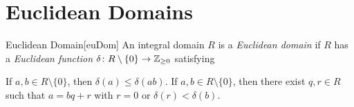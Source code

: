 \documentclass[../modern_algebra_2.tex]{subfiles}
\begin{document}
\section{Euclidean Domains}

\begin{Definition}{Euclidean Domain}[euDom]
    An integral domain \(R\) is a \emph{Euclidean domain} if \(R\) has a \emph{Euclidean function}
    \(\delta \colon R \setminus \{0\} \to \ZZ_{\ge 0}\) satisfying
    \begin{enumerate}[nolistsep, label=(EF\arabic*)]
        \ii
        If \(a, b \in R \setminus \{0\}\), then \(\delta(a) \le \delta(ab)\).
        \ii
        If \(a, b \in R \setminus \{0\}\), then
        there exist \(q, r \in R\) such that
        \(a = bq + r\) with \(r = 0\) or \(\delta(r) < \delta(b)\).
    \end{enumerate}
\end{Definition}
\end{document}
